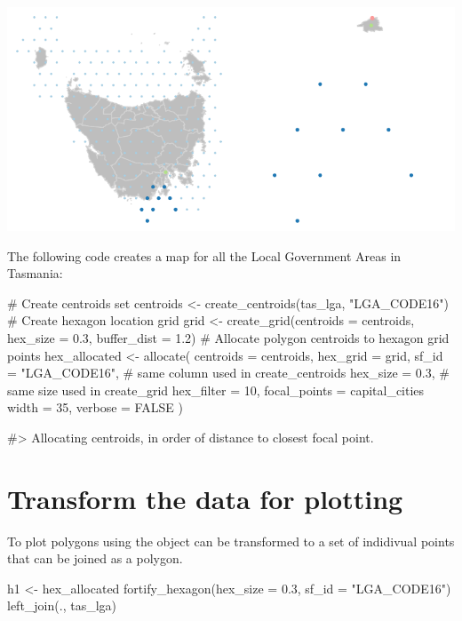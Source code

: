 \begin{Schunk}

\includegraphics{algorithmRjournal_files/figure-latex/buffs-1} \end{Schunk}

The following code creates a map for all the Local Government Areas in
Tasmania:

\begin{Schunk}
\begin{Sinput}
# Create centroids set
centroids <- create_centroids(tas_lga, "LGA_CODE16")
# Create hexagon location grid
grid <- create_grid(centroids = centroids,
    hex_size = 0.3,
    buffer_dist = 1.2)
# Allocate polygon centroids to hexagon grid points
hex_allocated <- allocate(
  centroids = centroids,
  hex_grid = grid,
  sf_id = "LGA_CODE16",
  # same column used in create_centroids
  hex_size = 0.3,
  # same size used in create_grid
  hex_filter = 10,
  focal_points = capital_cities %
  width = 35,
  verbose = FALSE
)
\end{Sinput}
\begin{Soutput}
#> Allocating centroids, in order of distance to closest focal point.
\end{Soutput}
\end{Schunk}

\hypertarget{transform-the-data-for-plotting}{%
\section{Transform the data for
plotting}\label{transform-the-data-for-plotting}}

To plot polygons using  the  object can be
transformed to a set of indidivual points that can be joined as a
polygon.

\begin{Schunk}
\begin{Sinput}
h1 <- hex_allocated %
  fortify_hexagon(hex_size = 0.3, 
  sf_id = "LGA_CODE16") %
  left_join(., tas_lga)
\end{Sinput}
\end{Schunk}

